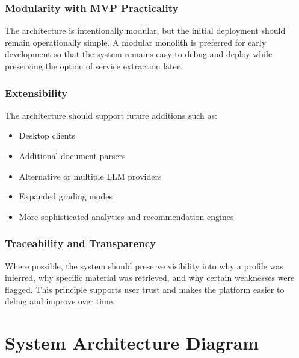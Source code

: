 \documentclass[11pt]{article}
\begin{document}
\subsubsection{Modularity with MVP Practicality}
The architecture is intentionally modular, but the initial deployment should remain operationally simple. A modular monolith is preferred for early development so that the system remains easy to debug and deploy while preserving the option of service extraction later.

\subsubsection{Extensibility}
The architecture should support future additions such as:
\begin{itemize}
\item Desktop clients
\item Additional document parsers
\item Alternative or multiple LLM providers
\item Expanded grading modes
\item More sophisticated analytics and recommendation engines
\end{itemize}

\subsubsection{Traceability and Transparency}
Where possible, the system should preserve visibility into why a profile was inferred, why specific material was retrieved, and why certain weaknesses were flagged. This principle supports user trust and makes the platform easier to debug and improve over time.

\section{System Architecture Diagram}
\end{document}
